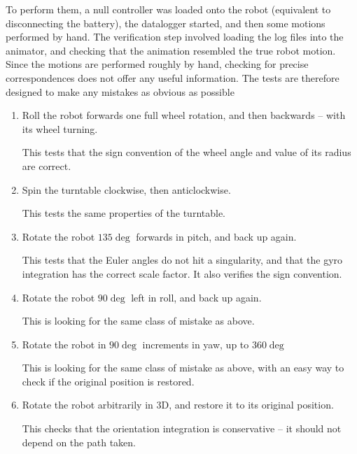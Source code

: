 \documentclass[main.tex]{subfiles}
\begin{document}
		To perform them, a null controller was loaded onto the robot (equivalent to disconnecting the battery), the datalogger started, and then some motions performed by hand.
		The verification step involved loading the log files into the animator, and checking that the animation resembled the true robot motion.
		Since the motions are performed roughly by hand, checking for precise correspondences does not offer any useful information.
		The tests are therefore designed to make any mistakes as obvious as possible


		\begin{enumerate}
			\item \label{sensor-test-wheel}
				Roll the robot forwards one full wheel rotation, and then backwards -- with its wheel turning.

				This tests that the sign convention of the wheel angle and value of its radius are correct.

			\item \label{sensor-test-tt}
				Spin the turntable clockwise, then anticlockwise.

				This tests the same properties of the turntable.

			\item \label{sensor-test-pitch}
				Rotate the robot $135\deg$ forwards in pitch, and back up again.

				This tests that the Euler angles do not hit a singularity, and that the gyro integration has the correct scale factor.
				It also verifies the sign convention.

			\item \label{sensor-test-roll}

			    Rotate the robot $90\deg$ left in roll, and back up again.

			    This is looking for the same class of mistake as above.

			\item \label{sensor-test-yaw}
				Rotate the robot in $90\deg$ increments in yaw, up to $360\deg$

			    This is looking for the same class of mistake as above, with an easy way to check if the original position is restored.

			\item \label{sensor-test-free}
			    Rotate the robot arbitrarily in 3D, and restore it to its original position.

			    This checks that the orientation integration is conservative -- it should not depend on the path taken.
		\end{enumerate}
\end{document}
